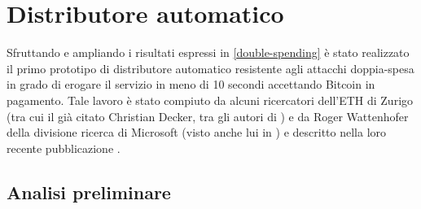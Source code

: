 \section{Distributore automatico}\label{distributore-automatico}

Sfruttando e ampliando i risultati espressi in \ref{double-spending} è stato realizzato il primo prototipo di distributore automatico resistente agli attacchi doppia-spesa in grado di erogare il servizio in meno di 10 secondi accettando Bitcoin in pagamento.  Tale lavoro è stato compiuto da alcuni ricercatori dell'ETH di Zurigo (tra cui il già citato Christian Decker, tra gli autori di \cite{bitcoinpropagation}) e da Roger Wattenhofer della divisione ricerca di Microsoft (visto anche lui in \cite{bitcoinpropagation}) e descritto nella loro recente pubblicazione \cite{bitcoinsnack}. \\

\subsection{Analisi preliminare}\label{doublespending-prevention-snack}

